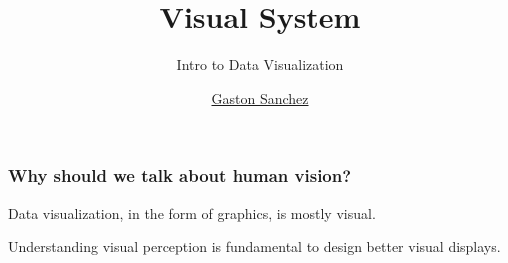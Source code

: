 \documentclass[12pt]{beamer}\usepackage[]{graphicx}\usepackage[]{color}
\title{Visual System}
\subtitle{Intro to Data Visualization}
\author{\href{http://www.gastonsanchez.com}{Gaston Sanchez}}
\institute{\href{https://creativecommons.org/licenses/by-sa/4.0/}{\tt \scriptsize \color{foreground} CC BY-SA 4.0}}
\date{}
\begin{document}
{
  \frame{\titlepage} 
}


\begin{frame}
\begin{center}
\Huge{}
\end{center}
\end{frame}


\begin{frame}
\frametitle{}
\begin{center}
\end{center}
\end{frame}


\begin{frame}
\frametitle{Why should we talk about human vision?}

Data visualization, in the form of graphics, is mostly visual.
\eb

Understanding visual perception is fundamental to design better visual
displays.
\eb

\end{frame}


{ %
    \begin{frame}[plain]
     \end{frame}
}
\end{document}
